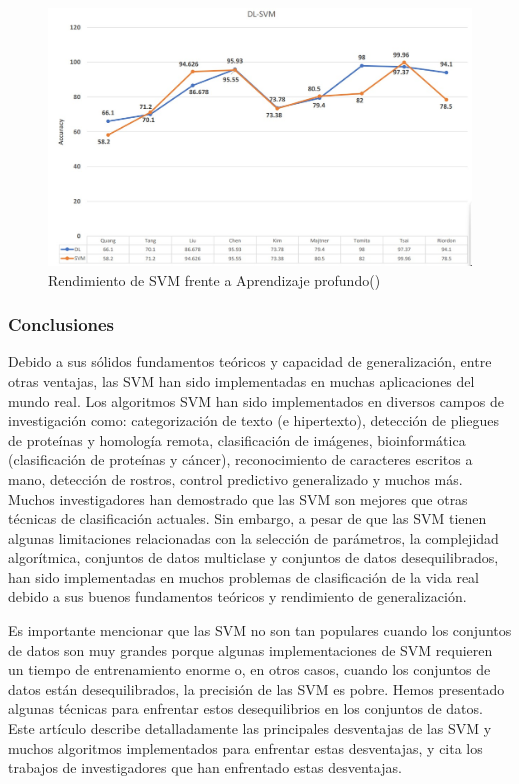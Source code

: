 \begin{figure}[H]
	\begin{center}
		\includegraphics[width=1\textwidth]{2/figures/svm6.jpeg}
		\caption{Rendimiento de SVM frente a Aprendizaje profundo(\cite{tecnica3})}
	\end{center}
\end{figure}

\subsubsection{Conclusiones}
Debido a sus sólidos fundamentos teóricos y capacidad de generalización, entre otras ventajas, las SVM han sido implementadas en muchas aplicaciones del mundo real. Los algoritmos SVM han sido implementados en diversos campos de investigación como: categorización de texto (e hipertexto), detección de pliegues de proteínas y homología remota, clasificación de imágenes, bioinformática (clasificación de proteínas y cáncer), reconocimiento de caracteres escritos a mano, detección de rostros, control predictivo generalizado y muchos más. Muchos investigadores han demostrado que las SVM son mejores que otras técnicas de clasificación actuales. Sin embargo, a pesar de que las SVM tienen algunas limitaciones relacionadas con la selección de parámetros, la complejidad algorítmica, conjuntos de datos multiclase y conjuntos de datos desequilibrados, han sido implementadas en muchos problemas de clasificación de la vida real debido a sus buenos fundamentos teóricos y rendimiento de generalización.

Es importante mencionar que las SVM no son tan populares cuando los conjuntos de datos son muy grandes porque algunas implementaciones de SVM requieren un tiempo de entrenamiento enorme o, en otros casos, cuando los conjuntos de datos están desequilibrados, la precisión de las SVM es pobre. Hemos presentado algunas técnicas para enfrentar estos desequilibrios en los conjuntos de datos. Este artículo describe detalladamente las principales desventajas de las SVM y muchos algoritmos implementados para enfrentar estas desventajas, y cita los trabajos de investigadores que han enfrentado estas desventajas.
